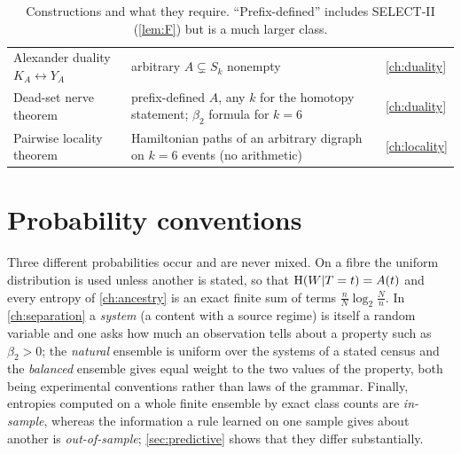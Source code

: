 \begin{table}[ht]
\begin{tabularx}{\textwidth}{@{}>{\raggedright\arraybackslash}p{4.2cm}>{\raggedright\arraybackslash}X>{\raggedright\arraybackslash}p{2.2cm}@{}}
Alexander duality $K_A\leftrightarrow Y_A$ & arbitrary $A\subsetneq S_k$ nonempty & \cref{ch:duality}\\
Dead-set nerve theorem & prefix-defined $A$, any $k$ for the homotopy statement; $\beta_2$ formula for $k=6$ & \cref{ch:duality}\\
Pairwise locality theorem & Hamiltonian paths of an arbitrary digraph on $k=6$ events (no arithmetic) & \cref{ch:locality}\\
\bottomrule
\end{tabularx}
\caption{Constructions and what they require. ``Prefix-defined'' includes SELECT-II (\cref{lem:F}) but is a much larger class.}\label{tab:needs}
\end{table}

\section{Probability conventions}\label{sec:probconv}
Three different probabilities occur and are never mixed. On a fibre the uniform distribution is used unless another is stated, so that $\mathrm{H}(W|T=t)=A(t)$ and every entropy of \cref{ch:ancestry} is an exact finite sum of terms $\frac nN\log_2\frac Nn$. In \cref{ch:separation} a \emph{system} (a content with a source regime) is itself a random variable and one asks how much an observation tells about a property such as $\beta_2>0$; the \emph{natural} ensemble is uniform over the systems of a stated census and the \emph{balanced} ensemble gives equal weight to the two values of the property, both being experimental conventions rather than laws of the grammar. Finally, entropies computed on a whole finite ensemble by exact class counts are \emph{in-sample}, whereas the information a rule learned on one sample gives about another is \emph{out-of-sample}; \cref{sec:predictive} shows that they differ substantially.
